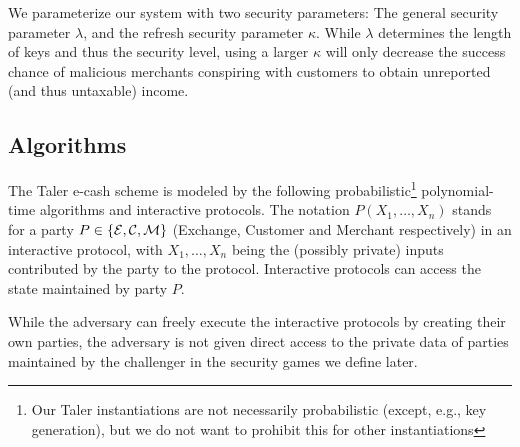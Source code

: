 We parameterize our system with two security parameters:  The general security
parameter $\lambda$, and the refresh security parameter $\kappa$.  While
$\lambda$ determines the length of keys and thus the security level, using a
larger $\kappa$ will only decrease the success chance of malicious merchants
conspiring with customers to obtain unreported (and thus untaxable) income.

\subsection{Algorithms}\label{sec:security-taler-syntax}

The Taler e-cash scheme is modeled by the following probabilistic\footnote{Our
Taler instantiations are not necessarily probabilistic (except, e.g., key
generation), but we do not want to prohibit this for other instantiations}
polynomial-time algorithms and interactive protocols.  The notation $P(X_1,\dots,X_n)$
stands for a party $P \in \{\mathcal{E}, \mathcal{C}, \mathcal{M}\}$ (Exchange, Customer
and Merchant respectively) in an interactive protocol, with $X_1,\dots,X_n$
being the (possibly private) inputs contributed by the party to the protocol.
Interactive protocols can access the state maintained by party $P$.

While the adversary can freely execute the interactive protocols by creating
their own parties, the adversary is not given direct access to the private data
of parties maintained by the challenger in the security games we define later.

